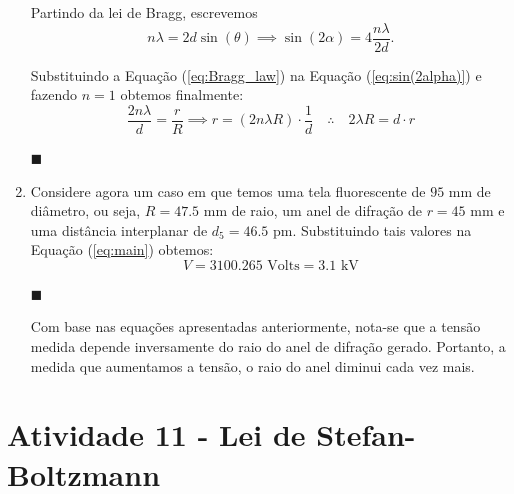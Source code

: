 \documentclass[12pt,a4paper]{article}
\begin{document}
\begin{enumerate}
        Partindo da lei de Bragg, escrevemos
        \begin{equation} \label{eq:Bragg_law}
            n\lambda=2d\sin{(\theta)}\implies\sin{(2\alpha)}=4\frac{n\lambda}{2d}.
        \end{equation}

        Substituindo a Equação (\ref{eq:Bragg_law}) na Equação (\ref{eq:sin(2alpha)}) e fazendo $n=1$ obtemos finalmente:
        \begin{equation*}
            \frac{2n\lambda}{d}=\frac{r}{R}\implies r=(2n\lambda R)\cdot\frac{1}{d}\quad\therefore\quad\boxed{2\lambda R=d\cdot r}
        \end{equation*}
        \begin{flushright}
            $\blacksquare$
        \end{flushright}
        

        \item Considere agora um caso em que temos uma tela fluorescente de $95\text{ mm}$ de diâmetro, ou seja, $R=47.5\text{ mm}$ de raio, um anel de difração de $r=45\text{ mm}$ e uma distância interplanar de $d_5=46.5\text{ pm}$. Substituindo tais valores na Equação (\ref{eq:main}) obtemos:
        \begin{equation}
            \boxed{V=3100.265\text{ Volts}=3.1\text{ kV}}
        \end{equation}
        \begin{flushright}
            $\blacksquare$
        \end{flushright}
        Com base nas equações apresentadas anteriormente, nota-se que a tensão medida depende inversamente do raio do anel de difração gerado. Portanto, a medida que aumentamos a tensão, o raio do anel diminui cada vez mais.

\end{enumerate}




\noindent\makebox[\linewidth]{\rule{\paperwidth}{0.4pt}}
\newpage


 
\section*{Atividade 11 - Lei de Stefan-Boltzmann}
\end{document}
